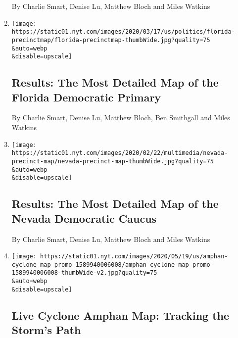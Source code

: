 \begin{enumerate}
  By Charlie Smart, Denise Lu, Matthew Bloch and Miles Watkins
\item
  \href{/interactive/2020/03/17/us/elections/precinct-map-florida-primary.html}{}

  \texttt{[image: https://static01.nyt.com/images/2020/03/17/us/politics/florida-precinctmap/florida-precinctmap-thumbWide.jpg?quality=75\\\&auto=webp\\\&disable=upscale]}

  \hypertarget{results-the-most-detailed-map-of-the-florida-democratic-primary}{%
  \subsection{Results: The Most Detailed Map of the Florida Democratic
  Primary}\label{results-the-most-detailed-map-of-the-florida-democratic-primary}}

  By Charlie Smart, Denise Lu, Matthew Bloch, Ben Smithgall and Miles
  Watkins
\item
  \href{/interactive/2020/02/22/us/elections/results-nevada-caucus-precinct-map.html}{}

  \texttt{[image: https://static01.nyt.com/images/2020/02/22/multimedia/nevada-precinct-map/nevada-precinct-map-thumbWide.jpg?quality=75\\\&auto=webp\\\&disable=upscale]}

  \hypertarget{results-the-most-detailed-map-of-the-nevada-democratic-caucus}{%
  \subsection{Results: The Most Detailed Map of the Nevada Democratic
  Caucus}\label{results-the-most-detailed-map-of-the-nevada-democratic-caucus}}

  By Charlie Smart, Denise Lu, Matthew Bloch and Miles Watkins
\item
  \href{/interactive/2020/05/19/world/asia/amphan-cyclone-map.html}{}

  \texttt{[image: https://static01.nyt.com/images/2020/05/19/us/amphan-cyclone-map-promo-1589940006008/amphan-cyclone-map-promo-1589940006008-thumbWide-v2.jpg?quality=75\\\&auto=webp\\\&disable=upscale]}

  \hypertarget{live-cyclone-amphan-map-tracking-the-storms-path}{%
  \subsection{Live Cyclone Amphan Map: Tracking the Storm's
  Path}\label{live-cyclone-amphan-map-tracking-the-storms-path}}


\end{enumerate}
